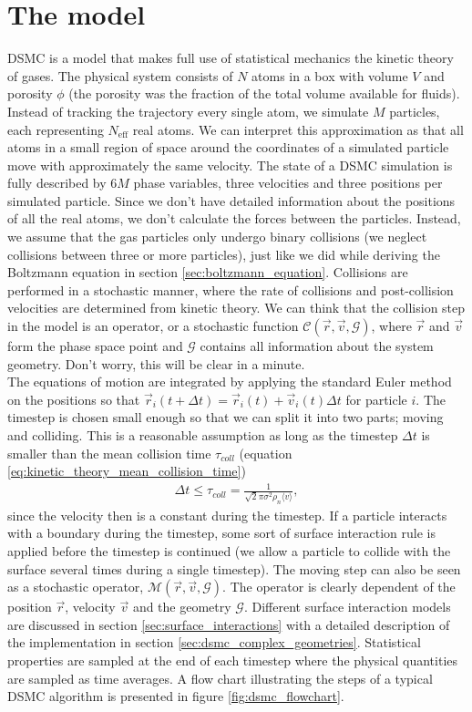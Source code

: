 \section{The model}
\label{sec:dsmc_model}
DSMC is a model that makes full use of statistical mechanics the kinetic theory of gases. The physical system consists of $N$ atoms in a box with volume $V$ and porosity $\phi$ (the porosity was the fraction of the total volume available for fluids). Instead of tracking the trajectory every single atom, we simulate $M$ particles, each representing $N_\text{eff}$ real atoms. We can interpret this approximation as that all atoms in a small region of space around the coordinates of a simulated particle move with approximately the same velocity. The state of a DSMC simulation is fully described by $6M$ phase variables, three velocities and three positions per simulated particle. Since we don't have detailed information about the positions of all the real atoms, we don't calculate the forces between the particles. Instead, we assume that the gas particles only undergo binary collisions (we neglect collisions between three or more particles), just like we did while deriving the Boltzmann equation in section \ref{sec:boltzmann_equation}. Collisions are performed in a stochastic manner, where the rate of collisions and post-collision velocities are determined from kinetic theory. We can think that the collision step in the model is an operator, or a stochastic function $\mathcal{C}(\vec r, \vec v, \mathcal{G})$, where $\vec r$ and $\vec v$ form the phase space point and $\mathcal G$ contains all information about the system geometry. Don't worry, this will be clear in a minute.\\
The equations of motion are integrated by applying the standard Euler method on the positions so that $\vec r_i(t+\Delta t) = \vec r_i(t) + \vec v_i(t)\Delta t$ for particle $i$. The timestep is chosen small enough so that we can split it into two parts; moving and colliding. This is a reasonable assumption as long as the timestep $\Delta t$ is smaller than the mean collision time $\tau_{coll}$ (equation \eqref{eq:kinetic_theory_mean_collision_time})
\begin{align}
	\Delta t \leq \tau_{coll} = \frac{1}{\sqrt 2 \pi \sigma^2 \rho_n \langle v \rangle},
\end{align}
since the velocity then is a constant during the timestep. If a particle interacts with a boundary during the timestep, some sort of surface interaction rule is applied before the timestep is continued (we allow a particle to collide with the surface several times during a single timestep). The moving step can also be seen as a stochastic operator, $\mathcal{M}(\vec r, \vec v, \mathcal{G})$. The operator is clearly dependent of the position $\vec r$, velocity $\vec v$ and the geometry $\mathcal{G}$. Different surface interaction models are discussed in section \ref{sec:surface_interactions} with a detailed description of the implementation in section \ref{sec:dsmc_complex_geometries}. Statistical properties are sampled at the end of each timestep where the physical quantities are sampled as time averages. A flow chart illustrating the steps of a typical DSMC algorithm is presented in figure \ref{fig:dsmc_flowchart}.
